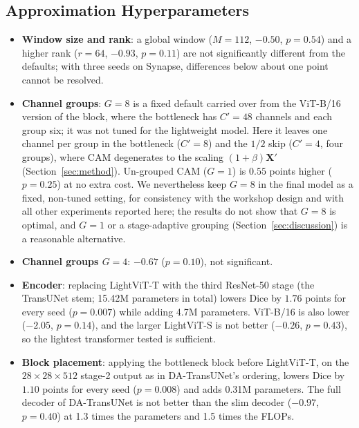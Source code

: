 \subsection{Approximation Hyperparameters}
\begin{itemize}
    \item \textbf{Window size and rank}: a global window ($M=112$, $-0.50$, $p = 0.54$) and a higher rank ($r=64$, $-0.93$, $p = 0.11$) are not significantly different from the defaults; with three seeds on Synapse, differences below about one point cannot be resolved.
    \item \textbf{Channel groups}: $G=8$ is a fixed default carried over from the ViT-B/16 version of the block, where the bottleneck has $C' = 48$ channels and each group six; it was not tuned for the lightweight model. Here it leaves one channel per group in the bottleneck ($C'=8$) and the $1/2$ skip ($C'=4$, four groups), where CAM degenerates to the scaling $(1+\beta)\mathbf{X}'$ (Section~\ref{sec:method}). Un-grouped CAM ($G=1$) is $0.55$ points higher ($p = 0.25$) at no extra cost. We nevertheless keep $G=8$ in the final model as a fixed, non-tuned setting, for consistency with the workshop design and with all other experiments reported here; the results do not show that $G=8$ is optimal, and $G=1$ or a stage-adaptive grouping (Section~\ref{sec:discussion}) is a reasonable alternative.
    \item \textbf{Channel groups $G=4$}: $-0.67$ ($p = 0.10$), not significant.
    \item \textbf{Encoder}: replacing LightViT-T with the third ResNet-50 stage (the TransUNet stem; 15.42M parameters in total) lowers Dice by $1.76$ points for every seed ($p = 0.007$) while adding 4.7M parameters. ViT-B/16 is also lower ($-2.05$, $p = 0.14$), and the larger LightViT-S is not better ($-0.26$, $p = 0.43$), so the lightest transformer tested is sufficient.
    \item \textbf{Block placement}: applying the bottleneck block before LightViT-T, on the $28\times28\times512$ stage-2 output as in DA-TransUNet's ordering, lowers Dice by $1.10$ points for every seed ($p = 0.008$) and adds 0.31M parameters. The full decoder of DA-TransUNet is not better than the slim decoder ($-0.97$, $p = 0.40$) at 1.3 times the parameters and 1.5 times the FLOPs.
\end{itemize}
